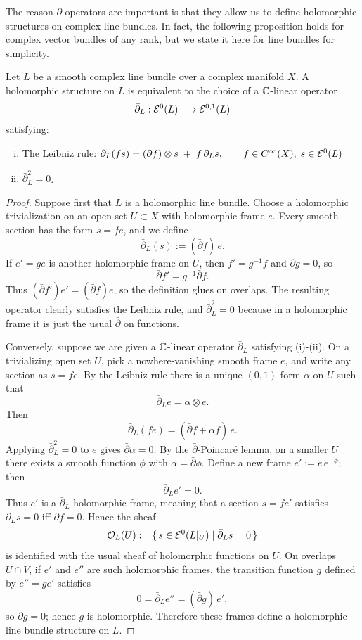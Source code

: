 \documentclass[12pt]{article}
\begin{document}
The reason $\bar{\partial}$ operators are important is that they allow us to define holomorphic structures on complex line bundles. In fact, the following proposition holds for complex vector bundles of any rank, but we state it here for line bundles for simplicity.
\begin{proposition}
Let $L$ be a smooth complex line bundle over a complex manifold $X$.
A holomorphic structure on $L$ is equivalent to the choice of a
$\mathbb{C}$-linear operator
\[
\bar\partial_L : {\mathcal{E}}^0(L) \longrightarrow {\mathcal{E}}^{0,1}(L)
\]
satisfying:
\begin{enumerate}[(i)]
\item The Leibniz rule: $\bar\partial_L(f s) = (\bar\partial f)\otimes s \;+\; f\,\bar\partial_L s,
\qquad f\in C^\infty(X),\; s\in{\mathcal{E}}^0(L) $
\item $\bar\partial_L^2 = 0$.
\end{enumerate}
\end{proposition}

\begin{proof}
Suppose first that $L$ is a holomorphic line bundle.  
Choose a holomorphic trivialization on an open set $U\subset X$ with
holomorphic frame $e$.  
Every smooth section has the form $s=f e$, and we define
\[
\bar\partial_L (s) := (\bar\partial f)\, e.
\]
If $e'=g e$ is another holomorphic frame on $U$, then  
$f' = g^{-1}f$ and $\bar\partial g=0$, so
\[
\bar\partial f' = g^{-1} \bar\partial f.
\]
Thus $(\bar\partial f')e' = (\bar\partial f)e$, so the definition
glues on overlaps.  
The resulting operator clearly satisfies the Leibniz rule, and
$\bar\partial_L^2=0$ because in a holomorphic frame it is just the usual
$\bar\partial$ on functions.

Conversely, suppose we are given a $\mathbb{C}$-linear operator
$\bar\partial_L$ satisfying (i)-(ii).  
On a trivializing open set $U$, pick a nowhere-vanishing smooth frame
$e$, and write any section as $s=f e$.  
By the Leibniz rule there is a unique $(0,1)$-form $\alpha$ on $U$ such
that
\[
\bar\partial_L e = \alpha\otimes e.
\]
Then
\[
\bar\partial_L(f e) = (\bar\partial f + \alpha f)\, e.
\]
Applying $\bar\partial_L^2=0$ to $e$ gives $\bar\partial\alpha=0$.
By the $\bar\partial$-Poincaré lemma, on a smaller $U$ there exists a
smooth function $\phi$ with $\alpha=\bar\partial\phi$.
Define a new frame $e' := e\, e^{-\phi}$; then
\[
\bar\partial_L e' = 0.
\]
Thus $e'$ is a $\bar\partial_L$-holomorphic frame, meaning that a
section $s=f e'$ satisfies $\bar\partial_L s=0$ iff $\bar\partial f=0$.
Hence the sheaf
\[
{\mathcal{O}}_L(U) := \{\, s\in{\mathcal{E}}^0(L|_U) \mid \bar\partial_L s = 0 \,\}
\]
is identified with the usual sheaf of holomorphic functions on $U$.
On overlaps $U\cap V$, if $e'$ and $e''$ are such holomorphic frames,
the transition function $g$ defined by $e'' = g e'$ satisfies
\[
0 = \bar\partial_L e'' = (\bar\partial g)\, e' ,
\]
so $\bar\partial g = 0$; hence $g$ is holomorphic.
Therefore these frames define a holomorphic line bundle structure on $L$.
\end{proof} 
\end{document}
